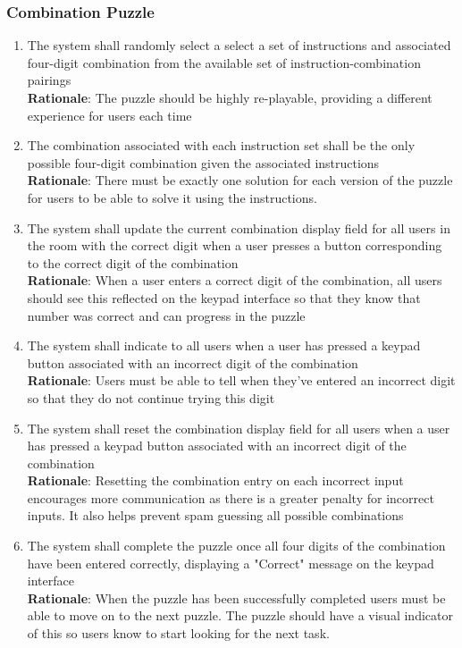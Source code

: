 \documentclass[12pt]{article}
\begin{document}
\subsubsection{Combination Puzzle}
    \begin{enumerate}[label=CP\arabic*., series=CombinationPuzzle]
        \item The system shall randomly select a select a set of instructions and associated four-digit combination from the available set of instruction-combination pairings\\
        \textbf{Rationale}: The puzzle should be highly re-playable, providing a different experience for users each time
        \item The combination associated with each instruction set shall be the only possible four-digit combination given the associated instructions\\
        \textbf{Rationale}: There must be exactly one solution for each version of the puzzle for users to be able to solve it using the instructions.
        \item The system shall update the current combination display field for all users in the room with the correct digit when a user presses a button corresponding to the correct digit of the combination\\
        \textbf{Rationale}: When a user enters a correct digit of the combination, all users should see this reflected on the keypad interface so that they know that number was correct and can progress in the puzzle
        \item The system shall indicate to all users when a user has pressed a keypad button associated with an incorrect digit of the combination\\
        \textbf{Rationale}: Users must be able to tell when they've entered an incorrect digit so that they do not continue trying this digit 
        \item The system shall reset the combination display field for all users when a user has pressed a keypad button associated with an incorrect digit of the combination\\
        \textbf{Rationale}: Resetting the combination entry on each incorrect input encourages more communication as there is a greater penalty for incorrect inputs. It also helps prevent spam guessing all possible combinations
        \item The system shall complete the puzzle once all four digits of the combination have been entered correctly, displaying a "Correct" message on the keypad interface\\
        \textbf{Rationale}: When the puzzle has been successfully completed users must be able to move on to the next puzzle. The puzzle should have a visual indicator of this so users know to start looking for the next task.
    \end{enumerate}
\end{document}
